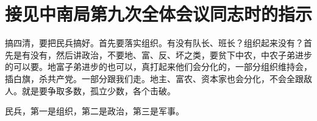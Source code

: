 \section[接见中南局第九次全体会议同志时的指示（一九六五年四月二十一日）]{接见中南局第九次全体会议同志时的指示}


搞四清，要把民兵搞好。首先要落实组织。有没有队长、班长？组织起来没有？首先是有没有，然后讲政治，不要地、富、反、坏之类，要贫下中农，中农子弟进步的可以要。地富子弟进步的也可以，真打起来他们会分化的，一部分组织维持会，插白旗，杀共产党。一部分跟我们走。地主、富农、资本家也会分化，不会全跟敌人。就是要争取多数，孤立少数，各个击破。

民兵，第一是组织，第二是政治，第三是军事。

